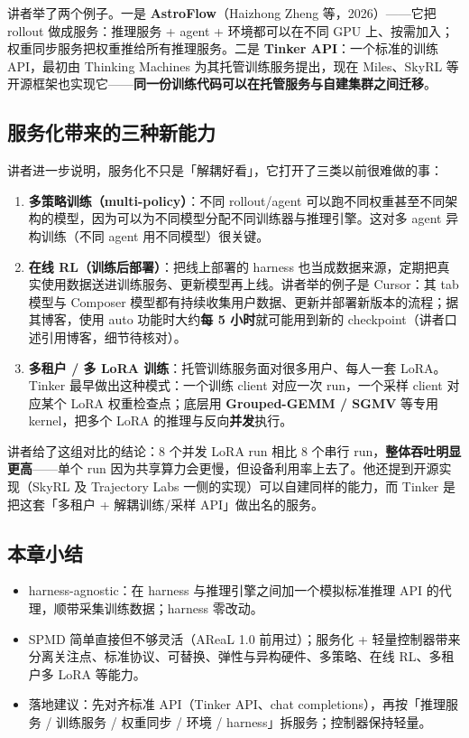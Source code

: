 \documentclass[a4paper]{article}
\begin{document}
讲者举了两个例子。一是 \textbf{AstroFlow}（Haizhong Zheng 等，2026）——它把 rollout 做成服务：推理服务 + agent + 环境都可以在不同 GPU 上、按需加入；权重同步服务把权重推给所有推理服务。二是 \textbf{Tinker API}：一个标准的训练 API，最初由 Thinking Machines 为其托管训练服务提出，现在 Miles、SkyRL 等开源框架也实现它——\textbf{同一份训练代码可以在托管服务与自建集群之间迁移}。

\subsection{服务化带来的三种新能力}

讲者进一步说明，服务化不只是「解耦好看」，它打开了三类以前很难做的事：

\begin{enumerate}
\item \textbf{多策略训练（multi-policy）}：不同 rollout/agent 可以跑不同权重甚至不同架构的模型，因为可以为不同模型分配不同训练器与推理引擎。这对多 agent 异构训练（不同 agent 用不同模型）很关键。
\item \textbf{在线 RL（训练后部署）}：把线上部署的 harness 也当成数据来源，定期把真实使用数据送进训练服务、更新模型再上线。讲者举的例子是 Cursor：其 tab 模型与 Composer 模型都有持续收集用户数据、更新并部署新版本的流程；据其博客，使用 auto 功能时大约\textbf{每 5 小时}就可能用到新的 checkpoint（讲者口述引用博客，细节待核对）。
\item \textbf{多租户 / 多 LoRA 训练}：托管训练服务面对很多用户、每人一套 LoRA。Tinker 最早做出这种模式：一个训练 client 对应一次 run，一个采样 client 对应某个 LoRA 权重检查点；底层用 \textbf{Grouped-GEMM / SGMV} 等专用 kernel，把多个 LoRA 的推理与反向\textbf{并发}执行。
\end{enumerate}

讲者给了这组对比的结论：8 个并发 LoRA run 相比 8 个串行 run，\textbf{整体吞吐明显更高}——单个 run 因为共享算力会更慢，但设备利用率上去了。他还提到开源实现（SkyRL 及 Trajectory Labs 一侧的实现）可以自建同样的能力，而 Tinker 是把这套「多租户 + 解耦训练/采样 API」做出名的服务。

\subsection{本章小结}

\begin{itemize}
\item harness-agnostic：在 harness 与推理引擎之间加一个模拟标准推理 API 的代理，顺带采集训练数据；harness 零改动。
\item SPMD 简单直接但不够灵活（AReaL 1.0 前用过）；服务化 + 轻量控制器带来分离关注点、标准协议、可替换、弹性与异构硬件、多策略、在线 RL、多租户多 LoRA 等能力。
\item 落地建议：先对齐标准 API（Tinker API、chat completions），再按「推理服务 / 训练服务 / 权重同步 / 环境 / harness」拆服务；控制器保持轻量。
\end{itemize}
\end{document}
